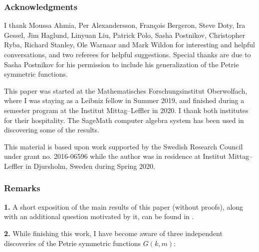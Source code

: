 \documentclass[numbers=enddot,12pt,final,onecolumn,notitlepage]{scrartcl}%
\theoremstyle{definition}
\newenvironment{fineprint}{\begin{small}}{\end{small}}
\begin{document}
\subsubsection*{Acknowledgments}

I thank Moussa Ahmia, Per Alexandersson, Fran\c{c}ois Bergeron, Steve Doty,
Ira Gessel, Jim Haglund, Linyuan Liu, Patrick Polo, Sasha Postnikov,
Christopher Ryba, Richard Stanley, Ole Warnaar and Mark Wildon for interesting
and helpful conversations, and two referees for helpful suggestions. Special
thanks are due to Sasha Postnikov for his permission to include his
generalization of the Petrie symmetric functions.

This paper was started at the Mathematisches Forschungsinstitut Oberwolfach,
where I was staying as a Leibniz fellow in Summer 2019, and finished during a
semester program at the Institut Mittag--Leffler in 2020. I thank both
institutes for their hospitality. The SageMath computer algebra system
\cite{SageMath} has been used in discovering some of the results.

\begin{fineprint}
This material is based upon work supported by the Swedish Research Council
under grant no. 2016-06596 while the author was in residence at Institut
Mittag--Leffler in Djursholm, Sweden during Spring 2020.
\end{fineprint}

\subsubsection*{Remarks}

\textbf{1.} A short exposition of the main results of this paper (without
proofs), along with an additional question motivated by it, can be found in
\cite{Grinbe20}.

\textbf{2.} While finishing this work, I have become aware of three
independent discoveries of the Petrie symmetric functions $G\left(
k,m\right)  $:
\end{document}
